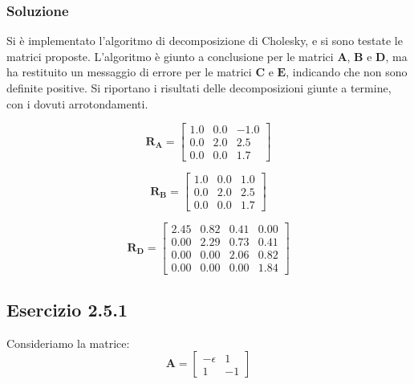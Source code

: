 \documentclass[letterpaper, 12pt]{article}
\begin{document}
\subsubsection{Soluzione}
Si è implementato l'algoritmo di decomposizione di Cholesky, e si sono testate le matrici proposte. L'algoritmo
è giunto a conclusione per le matrici $\mathbf{A}$, $\mathbf{B}$ e $\mathbf{D}$, ma ha restituito un messaggio di
errore per le matrici $\mathbf{C}$ e $\mathbf{E}$, indicando che non sono definite positive. 
Si riportano i risultati delle decomposizioni giunte a termine, con i dovuti arrotondamenti. 

\begin{center}
    \begin{minipage}{0.32\textwidth}
    \centering
    \[
    \mathbf{R_A} =
    \begin{bmatrix}
        1.0  &  0.0  &  -1.0 \\
        0.0  &  2.0  &  2.5 \\
        0.0  &  0.0  &  1.7
    \end{bmatrix}
    \]
    \end{minipage}
    \hfill
    \begin{minipage}{0.32\textwidth}
    \centering
    \[
    \mathbf{R_B} =
    \begin{bmatrix}
    1.0  &  0.0  &  1.0 \\
    0.0  &  2.0  &  2.5 \\
    0.0  &  0.0  &  1.7
    \end{bmatrix}
    \]
    \end{minipage}
    \hfill
    \begin{minipage}{0.32\textwidth}
    \centering
    \[
    \mathbf{R_D} =
    \begin{bmatrix}
    2.45 & 0.82 & 0.41 & 0.00 \\
    0.00 & 2.29 & 0.73 & 0.41 \\
    0.00 & 0.00 & 2.06 & 0.82 \\
    0.00 & 0.00 & 0.00 & 1.84
    \end{bmatrix}
    \]
    \end{minipage}
\end{center}

\subsection{Esercizio 2.5.1}
Consideriamo la matrice:
\[
\mathbf{A} =
\begin{bmatrix}
-\epsilon &  1 \\
        1 & -1
\end{bmatrix}
\]
\end{document}

